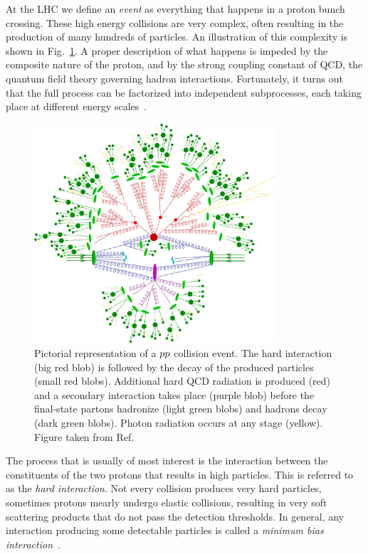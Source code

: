 
At the LHC we define an \textit{event} as everything that happens in a proton bunch crossing.
These high energy collisions are very complex, often resulting in the production of many hundreds of
particles. An illustration of this complexity is shown in Fig.~\ref{fig:event_full_event}.
A proper description of what happens is impeded by the composite nature of the proton, and by the
strong coupling constant of QCD, the quantum field theory governing hadron
interactions.
Fortunately, it turns out that the full process can be factorized into independent subprocesses,
each taking place at different energy scales~\cite{Skands:2011pf}. 


\begin{figure}[htpb]
  \centering
  \includegraphics[width=0.8\textwidth]{figures/eventreco_event/full_event}
  \caption{Pictorial representation of a ${p}{p}$ collision event.
The hard interaction (big red blob) is followed by the decay of the produced particles (small red
blobs).
Additional hard QCD radiation is produced (red) and a secondary interaction takes place (purple
blob) before the final-state partons hadronize (light green blobs) and hadrons decay (dark green
blobs). Photon radiation occurs at any stage (yellow). Figure taken from
Ref.~\cite{Gleisberg:2008ta}
  \label{fig:event_full_event}}
\end{figure}


The process that is usually of most interest is the interaction between the constituents of the two
protons that results in high \pt particles. This is referred to as the \textit{hard interaction}. 
Not every collision produces very hard particles, sometimes protons mearly undergo elastic
collisions, resulting in very soft scattering products that do not pass the detection thresholds. In
general, any interaction producing some detectable particles is called a \textit{minimum bias
interaction}~\cite{Field:2012jv}. 

